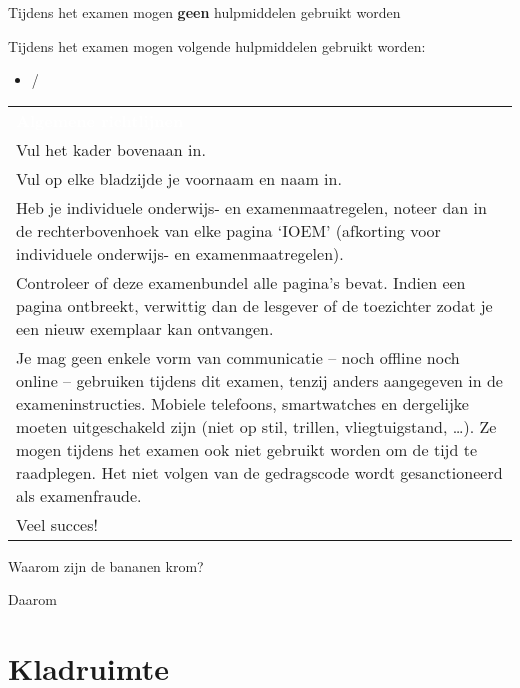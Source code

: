 \documentclass[10pt]{exam}
\begin{document}
\hoofding


\XBox \hspace{6pt} Tijdens het examen mogen \textbf{geen} hulpmiddelen gebruikt worden

\Square \hspace{6pt} Tijdens het examen mogen volgende hulpmiddelen gebruikt worden:

\begin{itemize}
\item /
\end{itemize}

\begin{tabular}{m{\textwidth}}
  \cellcolor{black} \textcolor{white}{\textbf{Algemene richtlijnen}} \\
  Vul het kader bovenaan in. \\
  \midrule
  Vul op elke bladzijde je voornaam en naam in. \\
  \midrule
  Heb je individuele onderwijs- en examenmaatregelen, noteer dan in de rechterbovenhoek van elke pagina `IOEM' (afkorting voor individuele onderwijs- en examenmaatregelen). \\
  \midrule
  Controleer of deze examenbundel alle pagina’s bevat. Indien een pagina ontbreekt, verwittig dan de lesgever of de toezichter zodat je een nieuw exemplaar kan ontvangen. \\
  \midrule
  Je mag geen enkele vorm van communicatie -- noch offline noch online -- gebruiken tijdens dit examen, tenzij anders aangegeven in de exameninstructies. Mobiele telefoons, smartwatches en dergelijke moeten uitgeschakeld zijn (niet op stil, trillen, vliegtuigstand, \ldots). Ze mogen tijdens het examen ook niet gebruikt worden om de tijd te raadplegen. Het niet volgen van de gedragscode wordt gesanctioneerd als examenfraude. \\
  \midrule
  Veel succes! \\
  \bottomrule
\end{tabular}

\begin{questions}

\framedsolutions
\ifsolution
  \printanswers
\else
  \noprintanswers
\fi


\question[10] Waarom zijn de bananen krom?

\begin{solutionordottedlines}[1cm]
  Daarom
\end{solutionordottedlines}

\end{questions}

\ifsolution
\else
\newpage
\section*{Kladruimte}

\fi
\end{document}
